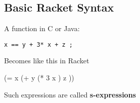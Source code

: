 
\subsection{Basic Racket Syntax}

A function in C or Java:

\begin{verbatim}
x == y + 3* x + z ;
\end{verbatim}

Becomes like this in Racket

\begin{racketcode}
(= x (+ y (* 3 x ) z ))
\end{racketcode}

Such expressions are called \textbf{s-expressions}

